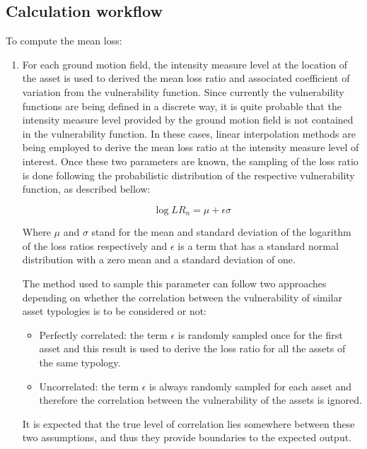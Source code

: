 \subsection{Calculation workflow}

To compute the mean loss:

\begin{enumerate}
\item For each ground motion field, the intensity measure level at the location of the asset is used to derived the mean loss ratio and associated coefficient of variation from the vulnerability function. Since currently the vulnerability functions are being defined in a discrete way, it is quite probable that the intensity measure level provided by the ground motion field is not contained in the vulnerability function. In these cases, linear interpolation methods are being employed to derive the mean loss ratio at the intensity measure level of interest. Once these two parameters are known, the sampling of the loss ratio is done following the probabilistic distribution of the respective vulnerability function, as described bellow:

\begin{equation}
\log{LR_n} = \mu + \epsilon\sigma
\end{equation}

Where $\mu$ and $\sigma$ stand for the mean and standard deviation of the logarithm of the loss ratios respectively and $\epsilon$ is a term that has a standard normal distribution with a zero mean and a standard deviation of one.  

The method used to sample this parameter can follow two approaches depending on whether the correlation between the vulnerability of similar asset typologies is to be considered or not:

\begin{itemize}

\item Perfectly correlated: the term $\epsilon$ is randomly sampled once for the first asset and this result is used to derive the loss ratio for all the assets of the same typology. 

\item Uncorrelated: the term $\epsilon$ is always randomly sampled for each asset and therefore the correlation between the vulnerability of the assets is ignored.

\end{itemize}

It is expected that the true level of correlation lies somewhere between these two assumptions, and thus they provide boundaries to the expected output. 



\end{enumerate}
